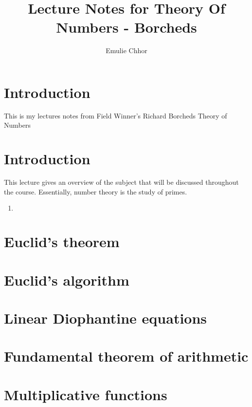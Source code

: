 \documentclass{article}
\begin{document}
\title{Lecture Notes for Theory Of Numbers - Borcheds}
\author{Emulie Chhor}
\maketitle

\section*{Introduction}

This is my lectures notes from Field Winner's Richard Borcheds Theory of
Numbers

\newtheorem{definition}{Definition}[subsection]
\newtheorem{theorem}{Theorem}[subsection]
\newtheorem{corollary}{Corollary}[subsection]
\newtheorem{lemma}[theorem]{Lemma}
\newtheorem{proposition}{Proposition}[section]
\newtheorem{axiom}{Axiome}
\newtheorem{property}{Propriété}[subsection]
\newtheorem*{remark}{Remarque}
\newtheorem*{problem}{Problème}
\newtheorem*{intuition}{Intuition}

\section{Introduction}

This lecture gives an overview of the subject that will be discussed
throughout the course. Essentially, number theory is the study of
primes.
\begin{enumerate}
    \item
\end{enumerate}

\section{Euclid's theorem}
\section{Euclid's algorithm}
\section{Linear Diophantine equations}
\section{Fundamental theorem of arithmetic}
\section{Multiplicative functions}
\end{document}
